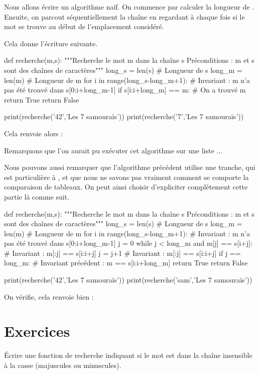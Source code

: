 Nous allons écrire un algorithme naïf. On commence par calculer la longueur de . 
Ensuite, on parcout séquentiellement la chaîne  en regardant à chaque fois si le mot se trouve au début de l'emplacement considéré.

Cela donne l'écriture suivante.
\begin{pyblock}
def recherche(m,s):
    """Recherche le mot m dans la chaîne s
       Préconditions : m et s sont des chaînes de caractères"""
    long_s = len(s) # Longueur de s
    long_m = len(m) # Longueur de m
    for i in range(long_s-long_m+1): 
        # Invariant : m n'a pas été trouvé dans s[0:i+long_m-1]
        if s[i:i+long_m] == m: # On a trouvé m
            return True
    return False

print(recherche('42','Les 7 samouraïs'))
print(recherche('7','Les 7 samouraïs'))
\end{pyblock}
Cela renvoie alors :
\begin{quote}
  \printpythontex[verb]
\end{quote}
Remarquons que l'on aurait pu exécuter cet algorithme sur une liste \python ...

Nous pouvons aussi remarquer que l'algorithme précédent utilise une tranche, qui est particulière à \python, et que nous ne savons pas vraiment comment se comporte la comparaison de tableaux. 
On peut ainsi choisir d'expliciter complètement cette partie là comme suit.
\begin{pyblock}
def recherche(m,s):
    """Recherche le mot m dans la chaîne s
       Préconditions : m et s sont des chaînes de caractères"""
    long_s = len(s) # Longueur de s
    long_m = len(m) # Longueur de m
    for i in range(long_s-long_m+1): 
        # Invariant : m n'a pas été trouvé dans s[0:i+long_m-1]
        j = 0
        while j < long_m and m[j] == s[i+j]:
            # Invariant : m[:j] == s[i:i+j]
            j = j+1
            # Invariant : m[:j] == s[i:i+j]
        if j == long_m:
            # Invariant précédent : m == s[i:i+long_m]
            return True
    return False

print(recherche('42','Les 7 samouraïs'))
print(recherche('sam','Les 7 samouraïs'))
\end{pyblock}
On vérifie, cela renvoie bien :
\begin{quote}
  \printpythontex[verb]
\end{quote}
\section{Exercices}
  \'Ecrire une fonction  de recherche indiquant si le mot  est dans la chaîne  insensible à la casse (majuscules ou minuscules).

